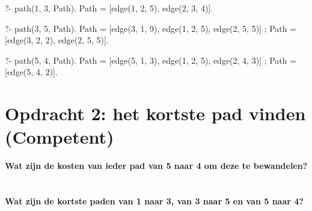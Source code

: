 \documentclass{uva-inf-article}
\begin{document}
?- path(1, 3, Path).
Path = [edge(1, 2, 5), edge(2, 3, 4)].

?- path(3, 5, Path).
Path = [edge(3, 1, 9), edge(1, 2, 5), edge(2, 5, 5)] ;
Path = [edge(3, 2, 2), edge(2, 5, 5)].

?- path(5, 4, Path).
Path = [edge(5, 1, 3), edge(1, 2, 5), edge(2, 4, 3)] ;
Path = [edge(5, 4, 2)].

\section{Opdracht 2: het kortste pad vinden (Competent)}
\textbf{Wat zijn de kosten van ieder pad van 5 naar 4 om deze te bewandelen?}\\
\\\\
\textbf{Wat zijn de kortste paden van 1 naar 3, van 3 naar 5 en van 5 naar 4?}\\
\\\\


\printbibliography


\end{document}
